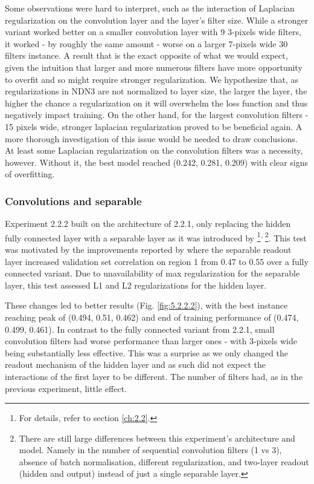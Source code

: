Some observations were hard to interpret, such as the interaction of Laplacian regularization on the convolution layer and the layer’s filter size. While a stronger variant worked better on a smaller convolution layer with 9 3-pixels wide filters, it worked - by roughly the same amount - worse on a larger 7-pixels wide 30 filters instance. A result that is the exact opposite of what we would expect, given the intuition that larger and more numerous filters have more opportunity to overfit and so might require stronger regularization. We hypothesize that, as regularizations in NDN3 are not normalized to layer size, the larger the layer, the higher the chance a regularization on it will overwhelm the loss function and thus negatively impact training. On the other hand, for the largest convolution filters - 15 pixels wide, stronger laplacian regularization proved to be beneficial again. A more thorough investigation of this issue would be needed to draw conclusions. At least some Laplacian regularization on the convolution filters was a necessity, however. Without it, the best model reached (0.242, 0.281, 0.209) with clear signs of overfitting.

\subsubsection{Convolutions and separable}

Experiment 2.2.2 built on the architecture of 2.2.1, only replacing the hidden fully connected layer with a separable layer as it was introduced by \cite{klidnt}\footnote{For details, refer to section \ref{ch:2.2}.}$^{,\thinspace}$\footnote{There are still large differences between this experiment’s architecture and \cite{klidnt} model. Namely in the number of sequential convolution filters (1 vs 3), absence of batch normalisation, different regularization, and two-layer readout (hidden and output) instead of just a single separable layer.}. This test was motivated by the improvements reported by \citeauthor{klidnt} where the separable readout layer increased validation set correlation on region 1 from 0.47 to 0.55 over a fully connected variant. Due to unavailability of max regularization for the separable layer, this test assessed L1 and L2 regularizations for the hidden layer.

These changes led to better results (Fig. \ref{fig:5.2.2.2}), with the best instance reaching peak of (0.494, 0.51, 0.462) and end of training performance of (0.474, 0.499, 0.461). In contrast to the fully connected variant from 2.2.1, small convolution filters had worse performance than larger ones - with 3-pixels wide being substantially less effective. This was a surprise as we only changed the readout mechanism of the hidden layer and as such did not expect the interactions of the first layer to be different. The number of filters had, as in the previous experiment, little effect.

